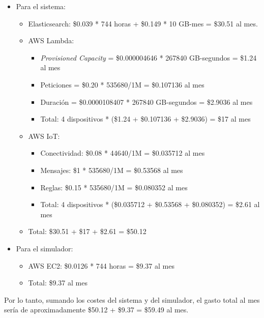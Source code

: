 \documentclass[../../memoria.tex]{subfiles}
\begin{document}
\begin{itemize}
    \item Para el sistema:
          \begin{itemize}
              \item Elasticsearch: \$0.039 * 744 horas + \$0.149 * 10 GB-mes = \$30.51 al mes.
              \item AWS Lambda:
                    \begin{itemize}
                        \item \textit{Provisioned Capacity} = \$0.000004646 * 267840 GB-segundos = \$1.24 al mes
                        \item Peticiones = \$0.20 * 535680/1M = \$0.107136 al mes
                        \item Duración = \$0.0000108407 * 267840 GB-segundos = \$2.9036 al mes
                        \item Total: 4 dispositivos * (\$1.24 + \$0.107136 + \$2.9036) = \$17 al mes
                    \end{itemize}
              \item AWS IoT:
                    \begin{itemize}
                        \item Conectividad: \$0.08 * 44640/1M = \$0.035712 al mes
                        \item Mensajes: \$1 *  535680/1M = \$0.53568 al mes
                        \item Reglas: \$0.15 * 535680/1M = \$0.080352 al mes
                        \item Total: 4 dispositivos * (\$0.035712 + \$0.53568 + \$0.080352) = \$2.61 al mes
                    \end{itemize}
              \item Total: \$30.51 + \$17 + \$2.61 = \$50.12
          \end{itemize}
    \item Para el simulador:
          \begin{itemize}
              \item AWS EC2: \$0.0126 * 744 horas = \$9.37 al mes
              \item Total: \$9.37 al mes
          \end{itemize}
\end{itemize}

Por lo tanto, sumando los costes del sistema y del simulador, el gasto total al mes sería de aproximadamente \$50.12 + \$9.37 = \$59.49 al mes.
\end{document}
